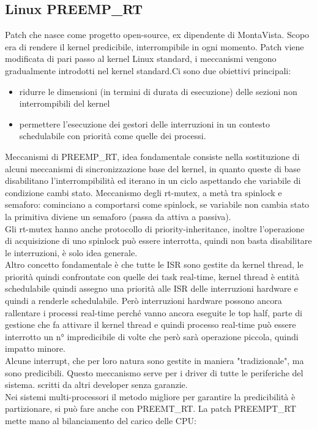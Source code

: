 \documentclass{article}
\begin{document}
\subsection{Linux PREEMP\_RT}
Patch che nasce come progetto open-source, ex dipendente di MontaVista. Scopo era di rendere il kernel predicibile, interrompibile in ogni momento. Patch viene modificata di pari passo al kernel Linux standard, i meccanismi vengono gradualmente introdotti nel kernel standard.Ci sono due obiettivi principali:
\begin{itemize}
\item ridurre le dimensioni (in termini di durata di esecuzione) delle sezioni non interrompibili del kernel
\item permettere l'esecuzione dei gestori delle interruzioni in un contesto schedulabile con priorità come quelle dei processi.
\end{itemize}
Meccanismi di PREEMP\_RT, idea fondamentale consiste nella sostituzione di alcuni meccanismi di sincronizzazione base del kernel, in quanto queste di base disabilitano l'interrompibilità ed iterano in un ciclo aspettando che variabile di condizione cambi stato. Meccanismo degli rt-mutex, a metà tra spinlock e semaforo: cominciano a comportarsi come spinlock, se variabile non cambia stato la primitiva diviene un semaforo (passa da attiva a passiva).\\ Gli rt-mutex hanno anche protocollo di priority-inheritance, inoltre l'operazione di acquisizione di uno spinlock può essere interrotta, quindi non basta disabilitare le interruzioni, è solo idea generale.\\ Altro concetto fondamentale è che tutte le ISR sono gestite da kernel thread, le priorità quindi confrontate con quelle dei task real-time, kernel thread è entità schedulabile quindi assegno una priorità alle ISR delle interruzioni hardware e quindi a renderle schedulabile. Però interruzioni hardware possono ancora rallentare i processi real-time perché vanno ancora eseguite le top half, parte di gestione che fa attivare il kernel thread e quindi processo real-time può essere interrotto un n° impredicibile di volte che però sarà operazione piccola, quindi impatto minore.\\ Alcune interrupt, che per loro natura sono gestite in maniera "tradizionale", ma sono predicibili. Questo meccanismo serve per i driver di tutte le periferiche del sistema. scritti da altri developer senza garanzie.\\ Nei sistemi multi-processori il metodo migliore per garantire la predicibilità è partizionare, si può fare anche con PREEMT\_RT. La patch PREEMPT\_RT mette mano al bilanciamento del carico delle CPU:
\end{document}
